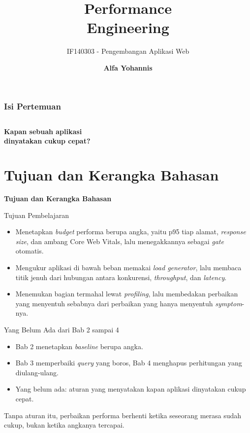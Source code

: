 \documentclass[aspectratio=169, table, 12pt]{beamer}
\title{\Huge Performance\\ \vspace{10pt} Engineering}
\subtitle{IF140303 - Pengembangan Aplikasi Web}
\author{\textbf{Alfa Yohannis}}
\begin{document}
\frame{\titlepage}

\begin{frame}[fragile]
  \frametitle{Isi Pertemuan}
  \vspace{14pt}
  \begin{columns}[t]
    {\small\tableofcontents[sections={1-7}]}

    {\small\tableofcontents[sections={8-14}]}
  \end{columns}
\end{frame}

\begin{frame}{\hfill}
  \centering
  \Huge{\textbf{Kapan sebuah aplikasi\\dinyatakan cukup cepat?}}
\end{frame}

\section{Tujuan dan Kerangka Bahasan}

\begin{frame}{\hfill}
  \centering
  \Huge{\textbf{Tujuan dan Kerangka Bahasan}}
\end{frame}

\begin{frame}{{\Large Tujuan Pembelajaran}}
  \vspace{10pt}
  \begin{itemize}
    \item Menetapkan \textit{budget} performa berupa angka, yaitu p95 tiap alamat,
          \textit{response size}, dan ambang Core Web Vitals, lalu menegakkannya
          sebagai \textit{gate} otomatis.
    \item Mengukur aplikasi di bawah beban memakai \textit{load generator},
          lalu membaca titik jenuh dari hubungan antara konkurensi,
          \textit{throughput}, dan \textit{latency}.
    \item Menemukan bagian termahal lewat \textit{profiling}, lalu membedakan
          perbaikan yang menyentuh sebabnya dari perbaikan yang hanya
          menyentuh \textit{symptom}-nya.
  \end{itemize}
\end{frame}

\begin{frame}{{\Large Yang Belum Ada dari Bab 2 sampai 4}}
  \vspace{10pt}
  \begin{itemize}
    \item Bab 2 menetapkan \textit{baseline} berupa angka.
    \item Bab 3 memperbaiki \textit{query} yang boros, Bab 4 menghapus perhitungan
          yang diulang-ulang.
    \item Yang belum ada: aturan yang menyatakan kapan aplikasi dinyatakan
          cukup cepat.
  \end{itemize}
  \vspace{8pt}
  {\footnotesize Tanpa aturan itu, perbaikan performa berhenti ketika
  seseorang merasa sudah cukup, bukan ketika angkanya tercapai.}
\end{frame}
\end{document}
